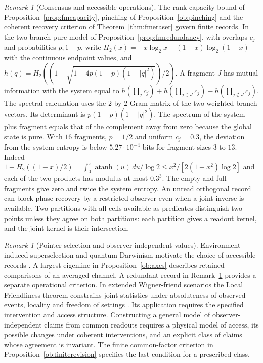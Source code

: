 \documentclass[aps,pra,onecolumn,superscriptaddress,nofootinbib,10pt]{revtex4-2}
\theoremstyle{definition}
\theoremstyle{remark}
\newtheorem{remark}[theorem]{Remark}
\begin{document}
\begin{remark}[Consensus and accessible operations]\label{ob:consensus}
The rank capacity bound of Proposition~\ref{prop:fmcapacity},
pinching of Proposition~\ref{ob:pinching} and the coherent
recovery criterion of Theorem~\ref{thm:fmeraser} govern finite records.
In the two-branch pure model of Proposition~\ref{prop:fmredundancy},
with overlaps $c_j$ and probabilities $p,1-p$, write
$H_2(x)=-x\log_2x-(1-x)\log_2(1-x)$ with the continuous endpoint
values, and $h(q)=H_2((1-\sqrt{1-4p(1-p)(1-|q|^2)})/2)$.
A fragment $J$ has mutual information with the system equal to
$h(\prod_jc_j)+h(\prod_{j\in J}c_j)-h(\prod_{j\notin J}c_j)$.
The spectral calculation uses the $2$ by $2$ Gram matrix of the two
weighted branch vectors. Its determinant is $p(1-p)(1-|q|^2)$.
The spectrum of the system plus fragment equals that of the
complement away from zero because the global state is pure.
With $16$ fragments, $p=1/2$ and uniform $c_j=0.3$, the
deviation from the system entropy is below $5.27\cdot10^{-4}$
bits for fragment sizes $3$ to $13$. Indeed
$1-H_2((1-x)/2)=\int_0^x\operatorname{atanh}(u)\,du/\log2
\le x^2/[2(1-x^2)\log2]$ and each of the two products has modulus
at most $0.3^3$. The empty and full fragments give zero and twice the
system entropy. An unread orthogonal record can block phase recovery
by a restricted observer even when a joint inverse is available.
Two partitions with all cells available as predicates distinguish
two points unless they agree on both partitions: each partition
gives a readout kernel, and the joint kernel is their intersection.
\end{remark}

\begin{remark}[Pointer selection and observer-independent values]\label{ob:objectivity}
Environment-induced superselection and quantum Darwinism motivate the
choice of accessible records \cite{n2-zurek81,n2-zurek09}.
A largest eigenline in Proposition~\ref{ob:axes} describes retained
comparisons of an averaged channel. A redundant record in
Remark~\ref{ob:consensus} provides a separate operational criterion.
In extended Wigner-friend scenarios the Local Friendliness theorem
constrains joint statistics under absoluteness of observed events,
locality and freedom of settings \cite{n3:Bong}. Its application
requires the specified intervention and access structure.
Constructing a general model of observer-independent claims from
common readouts requires a physical model of access, its possible
changes under coherent interventions, and an explicit class of
claims whose agreement is invariant. The finite common-factor
criterion in Proposition~\ref{ob:finiterevision} specifies the last
condition for a prescribed class.
\end{remark}
\end{document}
